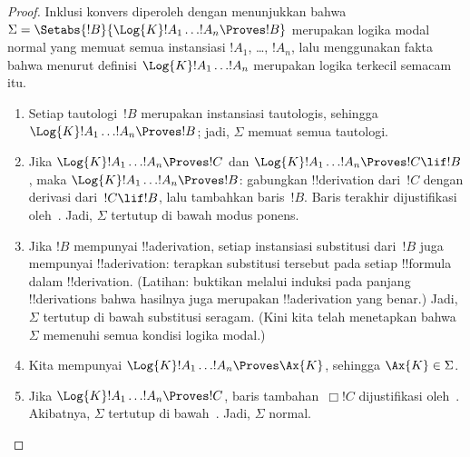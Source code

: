 \documentclass[../../../include/open-logic-section]{subfiles}
\begin{document}
\begin{proof}
  Inklusi konvers diperoleh dengan menunjukkan bahwa
  $\Sigma=\Setabs{!B}{\Log{K}!A_1\dots!A_n\Proves !B}$ merupakan logika modal
  normal yang memuat semua instansiasi $!A_1$, \dots, $!A_n$, lalu menggunakan
  fakta bahwa menurut definisi $\Log{K}!A_1\dots!A_n$ merupakan logika
  terkecil semacam itu.
  \begin{enumerate}
    \item Setiap tautologi~$!B$ merupakan instansiasi tautologis, sehingga
      $\Log{K}!A_1\dots!A_n\Proves !B$; jadi, $\Sigma$ memuat semua tautologi.
    \item Jika $\Log{K}!A_1\dots!A_n\Proves !C$ dan
      $\Log{K}!A_1\dots!A_n\Proves !C\lif !B$, maka
      $\Log{K}!A_1\dots!A_n\Proves !B$: gabungkan !!{derivation} dari~$!C$
      dengan derivasi dari~$!C\lif !B$, lalu tambahkan baris~$!B$. Baris
      terakhir dijustifikasi oleh~\MP{}. Jadi, $\Sigma$ tertutup di bawah
      modus ponens.
    \item Jika $!B$ mempunyai !!a{derivation}, setiap instansiasi substitusi
      dari~$!B$ juga mempunyai !!a{derivation}: terapkan substitusi tersebut
      pada setiap !!{formula} dalam !!{derivation}. (Latihan: buktikan melalui
      induksi pada panjang !!{derivation}s bahwa hasilnya juga merupakan
      !!a{derivation} yang benar.) Jadi, $\Sigma$ tertutup di bawah substitusi
      seragam. (Kini kita telah menetapkan bahwa $\Sigma$ memenuhi semua
      kondisi logika modal.)
    \item Kita mempunyai $\Log{K}!A_1\dots!A_n\Proves\Ax{K}$, sehingga
      $\Ax{K}\in\Sigma$.
    \item Jika $\Log{K}!A_1\dots!A_n\Proves !C$, baris tambahan~$\Box !C$
      dijustifikasi oleh~\Nec. Akibatnya, $\Sigma$ tertutup di bawah~\Nec.
      Jadi, $\Sigma$ normal.
  \end{enumerate}
\end{proof}
\end{document}
